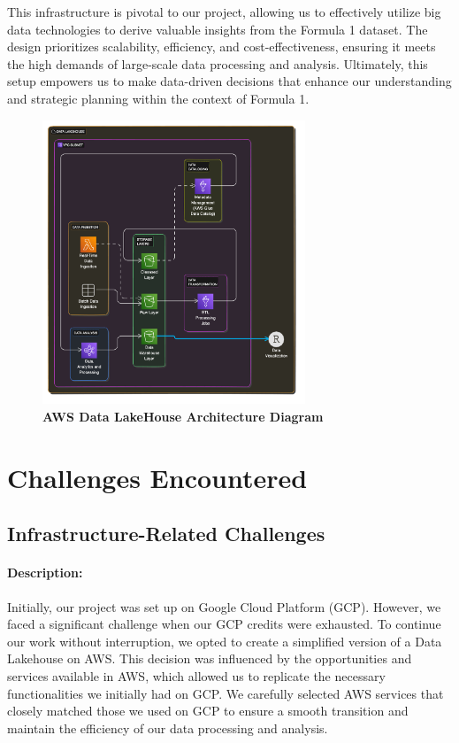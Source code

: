\documentclass{article}
\begin{document}
This infrastructure is pivotal to our project, allowing us to effectively utilize big data technologies to derive valuable insights from the Formula 1 dataset. The design prioritizes scalability, efficiency, and cost-effectiveness, ensuring it meets the high demands of large-scale data processing and analysis. Ultimately, this setup empowers us to make data-driven decisions that enhance our understanding and strategic planning within the context of Formula 1.

\begin{figure}[H]
    \centering
    \includegraphics[width=0.7\textwidth]{images/arch/AWS-GridGuru-LakeHouseArchitecture.png}
    \caption{\textbf{AWS Data LakeHouse Architecture Diagram}}
\end{figure}





\section{Challenges Encountered}
\subsection{Infrastructure-Related Challenges}
\paragraph{Description:}
Initially, our project was set up on Google Cloud Platform (GCP). However, we faced a significant challenge when our GCP credits were exhausted. To continue our work without interruption, we opted to create a simplified version of a Data Lakehouse on AWS. This decision was influenced by the opportunities and services available in AWS, which allowed us to replicate the necessary functionalities we initially had on GCP. We carefully selected AWS services that closely matched those we used on GCP to ensure a smooth transition and maintain the efficiency of our data processing and analysis.
\end{document}
